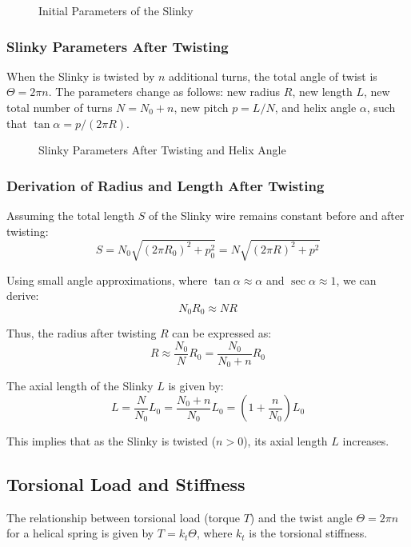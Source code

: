 \documentclass{mcmthesis}  %
\begin{document}
\begin{figure}[h!]
    \centering
    \caption{Initial Parameters of the Slinky}
    \label{fig:initial_params}
\end{figure}

\subsubsection{Slinky Parameters After Twisting}
When the Slinky is twisted by $n$ additional turns, the total angle of twist is $\Theta = 2\pi n$. The parameters change as follows: new radius $R$, new length $L$, new total number of turns $N = N_0 + n$, new pitch $p = L / N$, and helix angle $\alpha$, such that $\tan \alpha = p / (2\pi R)$.

\begin{figure}[h!]
    \centering
    \caption{Slinky Parameters After Twisting and Helix Angle}
    \label{fig:twisted_params}
\end{figure}

\subsubsection{Derivation of Radius and Length After Twisting}
Assuming the total length \(S\) of the Slinky wire remains constant before and after twisting:
\begin{equation}
S = N_0 \sqrt{(2\pi R_0)^2 + p_0^2} = N \sqrt{(2\pi R)^2 + p^2}
\end{equation}

Using small angle approximations, where \(\tan \alpha \approx \alpha\) and \(\sec \alpha \approx 1\), we can derive:
\begin{equation}
N_0 R_0 \approx N R
\end{equation}

Thus, the radius after twisting \(R\) can be expressed as:
\begin{equation}
R \approx \frac{N_0}{N} R_0 = \frac{N_0}{N_0 + n} R_0
\end{equation}

The axial length of the Slinky \(L\) is given by:
\begin{equation}
L = \frac{N}{N_0} L_0 = \frac{N_0+n}{N_0} L_0 = \left(1 + \frac{n}{N_0}\right) L_0
\end{equation}

This implies that as the Slinky is twisted (\(n > 0\)), its axial length \(L\) increases.

\subsection{Torsional Load and Stiffness}
The relationship between torsional load (torque \(T\)) and the twist angle \(\Theta = 2\pi n\) for a helical spring is given by \(T = k_t \Theta\), where \(k_t\) is the torsional stiffness.
\end{document}
